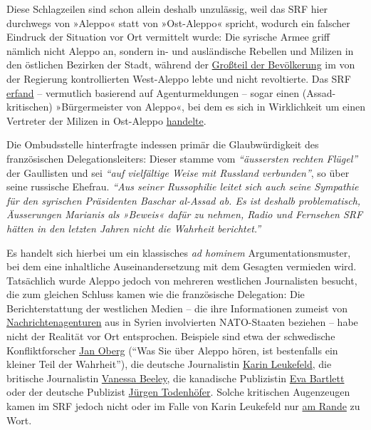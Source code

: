 Diese Schlagzeilen sind schon allein deshalb unzulässig, weil das SRF
hier durchwegs von »Aleppo« statt von »Ost-Aleppo« spricht, wodurch ein
falscher Eindruck der Situation vor Ort vermittelt wurde: Die syrische
Armee griff nämlich nicht Aleppo an, sondern in- und ausländische
Rebellen und Milizen in den östlichen Bezirken der Stadt, während der
\href{https://en.wikipedia.org/wiki/Battle_of_Aleppo_(2012\%E2\%80\%9316)}{Großteil
der Bevölkerung} im von der Regierung kontrollierten West-Aleppo lebte
und nicht revoltierte. Das SRF
\href{http://www.srf.ch/sendungen/heutemorgen/der-besuch-von-aleppos-buergermeister-bei-der-eu}{erfand}
-- vermutlich basierend auf Agenturmeldungen -- sogar einen
(Assad-kritischen) »Bürgermeister von Aleppo«, bei dem es sich in
Wirklichkeit um einen Vertreter der Milizen in Ost-Aleppo
\href{http://www.euronews.com/2016/12/15/tomorrow-is-too-late-mayor-of-east-aleppo-calls-on-the-eu-to-act}{handelte}.

Die Ombudsstelle hinterfragte indessen primär die Glaubwürdigkeit des
französischen Delegationsleiters: Dieser stamme vom \emph{``äussersten
rechten Flügel''} der Gaullisten und sei \emph{``auf vielfältige Weise
mit Russland verbunden''}, so über seine russische Ehefrau. \emph{``Aus
seiner Russophilie leitet sich auch seine Sympathie für den syrischen
Präsidenten Baschar al-Assad ab. Es ist deshalb problematisch,
Äusserungen Marianis als »Beweis« dafür zu nehmen, Radio und Fernsehen
SRF hätten in den letzten Jahren nicht die Wahrheit berichtet.''}

Es handelt sich hierbei um ein klassisches \emph{ad hominem}
Argumentationsmuster, bei dem eine inhaltliche Auseinandersetzung mit
dem Gesagten vermieden wird. Tatsächlich wurde Aleppo jedoch von
mehreren westlichen Journalisten besucht, die zum gleichen Schluss kamen
wie die französische Delegation: Die Berichterstattung der westlichen
Medien -- die ihre Informationen zumeist von
\href{https://swprs.org/der-propaganda-multiplikator/}{Nachrichtenagenturen}
aus in Syrien involvierten NATO-Staaten beziehen -- habe nicht der
Realität vor Ort entsprochen. Beispiele sind etwa der schwedische
Konfliktforscher
\href{https://www.heise.de/tp/features/Was-Sie-ueber-Aleppo-hoeren-ist-bestenfalls-ein-kleiner-Teil-der-Wahrheit-3610881.html}{Jan
Oberg} (``Was Sie über Aleppo hören, ist bestenfalls ein kleiner Teil
der Wahrheit''), die deutsche Journalistin
\href{http://www.n-tv.de/politik/Die-Syrer-wollen-ein-Ende-der-Kaempfe-article19323121.html}{Karin
Leukefeld}, die britische Journalistin
\href{http://21stcenturywire.com/2016/12/15/vanessa-beeley-heated-debate-on-western-medias-coverage-of-the-liberation-of-east-aleppo/}{Vanessa
Beeley}, die kanadische Publizistin
\href{http://21stcenturywire.com/2016/12/17/eva-bartlett-faces-off-with-dilly-hussain-on-syria-news-sources-and-propaganda/}{Eva
Bartlett} oder der deutsche Publizist
\href{http://www.ksta.de/politik/interview-mit-al-nusra-kommandeur--die-amerikaner-stehen-auf-unserer-seite--24802176}{Jürgen
Todenhöfer}. Solche kritischen Augenzeugen kamen im SRF jedoch nicht
oder im Falle von Karin Leukefeld nur
\href{http://www.srf.ch/news/international/hundertausende-leiden-in-aleppo-zwischen-den-fronten}{am
Rande} zu Wort.


